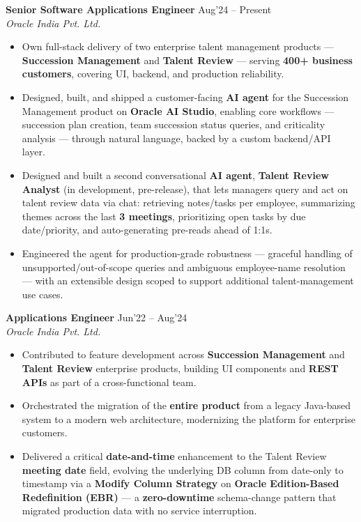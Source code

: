 \documentclass[10pt,a4paper]{article}
\newcommand{\resumeItem}[1]{\item[\textcolor{primary}{\textbullet}] #1}
\begin{document}
\textbf{Senior Software Applications Engineer} \hfill Aug'24 -- Present\\
\textit{Oracle India Pvt. Ltd.}
\begin{itemize}[leftmargin=1.05em, nosep, topsep=0pt, itemsep=0pt, parsep=0pt]
    \resumeItem{Own full-stack delivery of two enterprise talent management products --- \textbf{Succession Management} and \textbf{Talent Review} --- serving \textbf{400+ business customers}, covering UI, backend, and production reliability.}
    \resumeItem{Designed, built, and shipped a customer-facing \textbf{AI agent} for the Succession Management product on \textbf{Oracle AI Studio}, enabling core workflows --- succession plan creation, team succession status queries, and criticality analysis --- through natural language, backed by a custom backend/API layer.}
    \resumeItem{Designed and built a second conversational \textbf{AI agent}, \textbf{Talent Review Analyst} (in development, pre-release), that lets managers query and act on talent review data via chat: retrieving notes/tasks per employee, summarizing themes across the last \textbf{3 meetings}, prioritizing open tasks by due date/priority, and auto-generating pre-reads ahead of 1:1s.}
    \resumeItem{Engineered the agent for production-grade robustness --- graceful handling of unsupported/out-of-scope queries and ambiguous employee-name resolution --- with an extensible design scoped to support additional talent-management use cases.}
\end{itemize}

\vspace{1pt}
\textbf{Applications Engineer} \hfill Jun'22 -- Aug'24\\
\textit{Oracle India Pvt. Ltd.}
\begin{itemize}[leftmargin=1.05em, nosep, topsep=0pt, itemsep=0pt, parsep=0pt]
    \resumeItem{Contributed to feature development across \textbf{Succession Management} and \textbf{Talent Review} enterprise products, building UI components and \textbf{REST APIs} as part of a cross-functional team.}
    \resumeItem{Orchestrated the migration of the \textbf{entire product} from a legacy Java-based system to a modern web architecture, modernizing the platform for enterprise customers.}
    \resumeItem{Delivered a critical \textbf{date-and-time} enhancement to the Talent Review \textbf{meeting date} field, evolving the underlying DB column from date-only to timestamp via a \textbf{Modify Column Strategy} on \textbf{Oracle Edition-Based Redefinition (EBR)} --- a \textbf{zero-downtime} schema-change pattern that migrated production data with no service interruption.}
\end{itemize}
\end{document}
